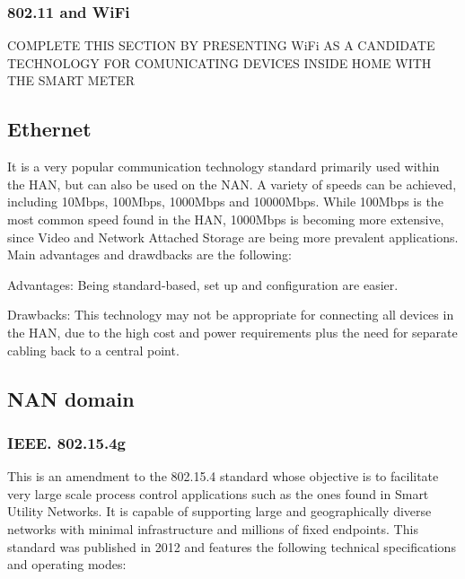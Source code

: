 \documentclass[11pt,draftclsnofoot,onecolumn]{IEEEtran}
\begin{document}
 
%

\subsubsection{802.11 and WiFi}
COMPLETE THIS SECTION BY PRESENTING WiFi AS A CANDIDATE TECHNOLOGY FOR COMUNICATING DEVICES INSIDE HOME WITH THE SMART METER

\subsection{Ethernet}\label{ethernetl}

It is a very popular communication technology standard primarily used within the HAN, but can also be used on the NAN. A variety of speeds can be achieved, including 10Mbps, 100Mbps, 1000Mbps and 10000Mbps. While 100Mbps is the most common speed found in the HAN, 1000Mbps is becoming more extensive, since Video and Network Attached Storage are being more prevalent applications. Main advantages and drawdbacks are the following:

Advantages: Being standard-based, set up and configuration are easier.

Drawbacks: This technology may not be appropriate for connecting all devices in the HAN, due to the high cost and power requirements plus the need for separate cabling back to a central point.

\subsection{NAN domain}

\subsubsection{IEEE. 802.15.4g}\label{tech::802154g}

This is an amendment to the 802.15.4 standard whose objective is to facilitate very large scale process control applications such as the ones found in Smart Utility Networks. It is capable of supporting large and geographically diverse networks with minimal infrastructure and millions of fixed endpoints. This standard was published in 2012 and features the following technical specifications and operating modes:
\end{document}
